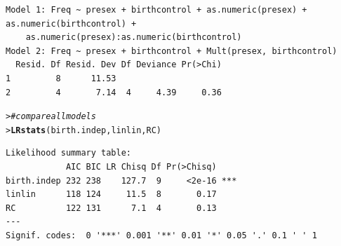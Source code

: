 \documentclass[10pt]{report}\usepackage[]{graphicx}\usepackage[]{color}
\makeatletter
\newcommand{\hlcom}[1]{\textcolor[rgb]{0.678,0.584,0.686}{\textit{#1}}}%
\newcommand{\hlstd}[1]{\textcolor[rgb]{0.345,0.345,0.345}{#1}}%
\newcommand{\hlkwd}[1]{\textcolor[rgb]{0.737,0.353,0.396}{\textbf{#1}}}%
\newenvironment{kframe}{%
 \def\at@end@of@kframe{}%
 \ifinner\ifhmode%
  \def\at@end@of@kframe{\end{minipage}}%
  \begin{minipage}{\columnwidth}%
 \fi\fi%
 \def\FrameCommand##1{\hskip\@totalleftmargin \hskip-\fboxsep
 \colorbox{shadecolor}{##1}\hskip-\fboxsep
     \hskip-\linewidth \hskip-\@totalleftmargin \hskip\columnwidth}%
 \MakeFramed {\advance\hsize-\width
   \@totalleftmargin\z@ \linewidth\hsize
   \@setminipage}}%
 {\par\unskip\endMakeFramed%
 \at@end@of@kframe}
\newenvironment{knitrout}{}{} %
\renewenvironment{knitrout}{\small\renewcommand{\baselinestretch}{.85}}{} %
\makeatother
\begin{document}
\begin{Exercises}
\begin{enumerate*}
\begin{ans}
\begin{knitrout}
\begin{kframe}
\begin{verbatim}
Model 1: Freq ~ presex + birthcontrol + as.numeric(presex) + as.numeric(birthcontrol) + 
    as.numeric(presex):as.numeric(birthcontrol)
Model 2: Freq ~ presex + birthcontrol + Mult(presex, birthcontrol)
  Resid. Df Resid. Dev Df Deviance Pr(>Chi)
1         8      11.53                     
2         4       7.14  4     4.39     0.36
\end{verbatim}
\begin{alltt}
\hlstd{> }  \hlcom{# compare all models}
\hlstd{> }\hlkwd{LRstats}\hlstd{(birth.indep, linlin, RC)}
\end{alltt}
\begin{verbatim}
Likelihood summary table:
            AIC BIC LR Chisq Df Pr(>Chisq)    
birth.indep 232 238    127.7  9     <2e-16 ***
linlin      118 124     11.5  8       0.17    
RC          122 131      7.1  4       0.13    
---
Signif. codes:  0 '***' 0.001 '**' 0.01 '*' 0.05 '.' 0.1 ' ' 1
\end{verbatim}
\end{kframe}
\end{knitrout}
    \end{ans}
    

\end{enumerate*}
\end{Exercises}
\end{document}
